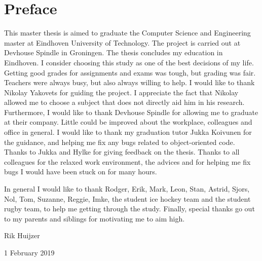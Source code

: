 \chapter*{Preface}
\label{ch:preface}

This master thesis is aimed to graduate the Computer Science and Engineering master at Eindhoven University of Technology.
The project is carried out at Devhouse Spindle in Groningen.
The thesis concludes my education in Eindhoven.
I consider choosing this study as one of the best decisions of my life.
Getting good grades for assignments and exams was tough, but grading was fair.
Teachers were always busy, but also always willing to help.
I would like to thank Nikolay Yakovets for guiding the project.
I appreciate the fact that Nikolay allowed me to choose a subject that does not directly aid him in his research.
Furthermore, I would like to thank Devhouse Spindle for allowing me to graduate at their company.
Little could be improved about the workplace, colleagues and office in general.
I would like to thank my graduation tutor Jukka Koivunen for the guidance, and helping me fix any bugs related to object-oriented code.
Thanks to Jukka and Hylke for giving feedback on the thesis.
Thanks to all colleagues for the relaxed work environment, the advices and for helping me fix bugs I would have been stuck on for many hours.

In general I would like to thank Rodger, Erik, Mark, Leon, Stan, Astrid, Sjors, Nol, Tom, Suzanne, Reggie, Imke, the student ice hockey team and the student rugby team, to help me getting through the study.
Finally, special thanks go out to my parents and siblings for motivating me to aim high.


\vspace*{5mm}
Rik Huijzer

1 February 2019